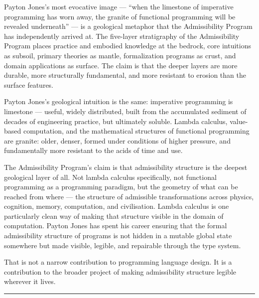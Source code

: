\documentclass[12pt]{article}
\begin{document}
Payton Jones's most evocative image — ``when the limestone of imperative
programming has worn away, the granite of functional programming will be
revealed underneath'' — is a geological metaphor that the Admissibility Program
has independently arrived at. The five-layer stratigraphy of the Admissibility
Program places practice and embodied knowledge at the bedrock, core intuitions
as subsoil, primary theories as mantle, formalization programs as crust, and
domain applications as surface. The claim is that the deeper layers are more
durable, more structurally fundamental, and more resistant to erosion than the
surface features.

Payton Jones's geological intuition is the same: imperative programming is
limestone — useful, widely distributed, built from the accumulated sediment of
decades of engineering practice, but ultimately soluble. Lambda calculus, value-
based computation, and the mathematical structures of functional programming are
granite: older, denser, formed under conditions of higher pressure, and
fundamentally more resistant to the acids of time and use.

The Admissibility Program's claim is that admissibility structure is the
deepest geological layer of all. Not lambda calculus specifically, not
functional programming as a programming paradigm, but the geometry of what
can be reached from where — the structure of admissible transformations across
physics, cognition, memory, computation, and civilisation. Lambda calculus is
one particularly clean way of making that structure visible in the domain of
computation. Payton Jones has spent his career ensuring that the formal
admissibility structure of programs is not hidden in a mutable global state
somewhere but made visible, legible, and repairable through the type system.

That is not a narrow contribution to programming language design. It is a
contribution to the broader project of making admissibility structure legible
wherever it lives.

\bigskip
\noindent\textcolor{formalismgray}{\rule{\linewidth}{0.4pt}}
\smallskip
{}
\end{document}

